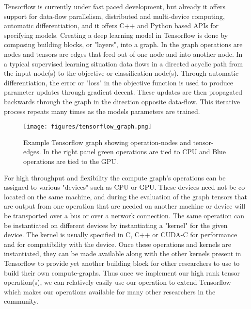 Tensorflow is currently under fast paced development, but already it offers support for data-flow parallelism, distributed and multi-device computing, automatic differentiation, and it offers C++ and Python based APIs for specifying models. Creating a deep learning model in Tensorflow is done by composing building blocks, or "layers", into a graph. In the graph operations are nodes and tensors are edges that feed out of one node and into another node. In a typical supervised learning situation data flows in a directed acyclic path from the input node(s) to the objective or classification node(s). Through automatic differentiation, the error or "loss" in the objective function is used to produce parameter updates through gradient decent. These updates are then propagated backwards through the graph in the direction opposite data-flow. This iterative process repeats many times as the models parameters are trained.

\begin{figure*}
\centering
\texttt{[image: figures/tensorflow\_graph.png]}
\caption{Example Tensorflow graph showing operation-nodes and tensor-edges. In the right panel green operations are tied to CPU and Blue operations are tied to the GPU.}
\label{fig:lda}
\end{figure*}

For high throughput and flexibility the compute graph's operations can be assigned to various "devices" such as CPU or GPU. These devices need not be co-located on the same machine, and during the evaluation of the graph tensors that are output from one operation that are needed on another machine or device will be transported over a bus or over a network connection. The same operation can be instantiated on different devices by instantiating a "kernel" for the given device. The kernel is usually specified in C, C++ or CUDA-C for performance and for compatibility with the device. Once these operations and kernels are instantiated, they can be made available along with the other kernels present in Tensorflow to provide yet another building block for other researchers to use to build their own compute-graphs. Thus once we implement our high rank tensor operation(s), we can relatively easily use our operation to extend Tensorflow which makes our operations available for many other researchers in the community.

